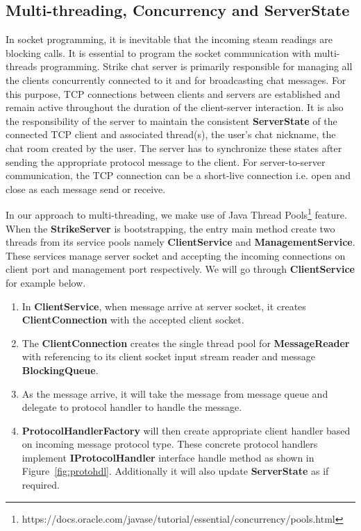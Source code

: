 \documentclass[dareport.tex]{subfiles}
\begin{document}
\subsection{Multi-threading, Concurrency and ServerState}
In socket programming, it is inevitable that the incoming steam readings are blocking calls. It is essential to program the socket communication with multi-threads programming. Strike chat server is primarily responsible for managing all the clients concurrently connected to it and for broadcasting chat messages. For this purpose, TCP connections between clients and servers are established and remain active throughout the duration of the client-server interaction. It is also the responsibility of the server to maintain the consistent \textbf{ServerState} of the connected TCP client and associated thread(s), the user's chat nickname, the chat room created by the user. The server has to synchronize these states after sending the appropriate protocol message to the client. For server-to-server communication, the TCP connection can be a short-live connection i.e. open and close as each message send or receive. 

In our approach to multi-threading, we make use of Java Thread Pools\footnote{https://docs.oracle.com/javase/tutorial/essential/concurrency/pools.html} feature. When the \textbf{StrikeServer} is bootstrapping, the entry main method create two threads from its service pools namely \textbf{ClientService} and \textbf{ManagementService}. These services manage server socket and accepting the incoming connections on client port and management port respectively. We will go through \textbf{ClientService} for example below.

\begin{enumerate}[leftmargin=*]

\item In \textbf{ClientService}, when message arrive at server socket, it creates \textbf{ClientConnection} with the accepted client socket.

\item The \textbf{ClientConnection} creates the single thread pool for \textbf{MessageReader} with referencing to its client socket input stream reader and message \textbf{BlockingQueue}.

\item As the message arrive, it will take the message from message queue and delegate to protocol handler to handle the message.

\item \textbf{ProtocolHandlerFactory} will then create appropriate client handler based on incoming message protocol type. These concrete protocol handlers implement \textbf{IProtocolHandler} interface handle method as shown in Figure~\ref{fig:protohdl}. Additionally it will also update \textbf{ServerState} as if required.

\end{enumerate}
\end{document}
